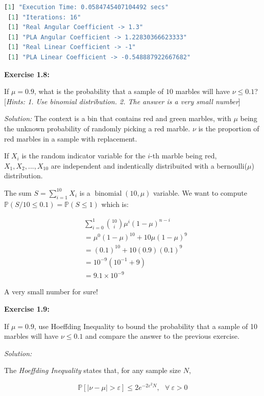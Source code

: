 \documentclass[12pt,letterpaper]{article}
\begin{document}
		 \begin{lstlisting}[language=R]
 [1] "Execution Time: 0.0584745407104492 secs"
 [1] "Iterations: 16"
 [1] "Real Angular Coefficient -> 1.3"
 [1] "PLA Angular Coefficient -> 1.22830366623333"
 [1] "Real Linear Coefficient -> -1"
 [1] "PLA Linear Coefficient -> -0.548887922667682"
		 \end{lstlisting}
		 
		 \textbf{Exercise 1.8:}
		 
		 If $\mu=0.9$, what is the probability that a sample of $10$ marbles will have $\nu\leq 0.1$? [\emph{Hints: 1. Use binomial distribution. 2. The answer is a very small number}]
		 
		 \textit{Solution: } The context is a bin that contains red and green marbles, with $\mu$ being the unknown probability of randomly picking a red marble. $\nu$ is the proportion of red marbles in a sample with replacement.
		 
		 If $X_i$ is the random indicator variable for the $i$-th marble being red, $X_1,X_2,...,X_10$ are independent and indentically distribuited with a bernoulli($\mu$) distribution.
		 
		 The sum $S=\sum_{i=1}^{10}X_i$ is a $\operatorname{binomial}(10,\mu)$ variable. We want to compute $\mathbb{P}(S/10\leq 0.1)=\mathbb{P}(S\leq 1)$ which is:
		 
		 \begin{align*}
		 &\displaystyle\sum_{i=0}^{1}{10 \choose i}\mu^i(1-\mu)^{n-i}\\
		 &=\mu^0(1-\mu)^{10}+10\mu(1-\mu)^9\\
		 &=(0.1)^{10}+10(0.9)(0.1)^9\\
		 &=10^{-9}(10^{-1}+9)\\
		 &=9.1\times 10^{-9}
		 \end{align*}
		 
		 A very small number for sure!
		 
	\textbf{Exercise 1.9:}
	
	If $\mu=0.9$, use Hoeffding Inequality to bound the probability that a sample of 10 marbles will have $\nu\leq 0.1$ and compare the answer to the previous exercise.
	
	\textit{Solution:} 
	
	The \textit{Hoeffding Inequality}\cite{yaser2012learning} states that, for any sample size $N$,
	
	$$\mathbb{P}[|\nu-\mu|>\varepsilon]\leq2 e^{-2\varepsilon^2N},~~~\forall~\varepsilon>0$$
	
\end{document}
